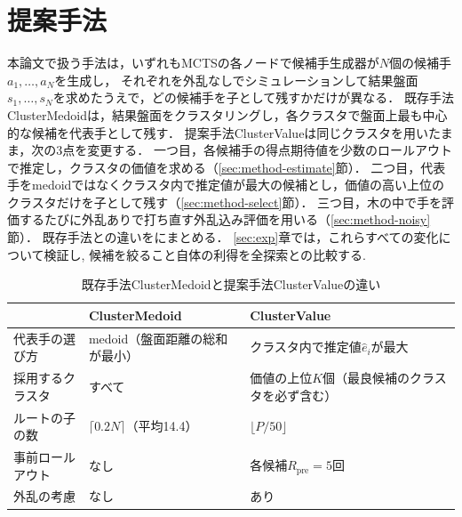 \documentclass[submit]{ipsj}
\begin{document}
\section{提案手法}
\label{sec:method}

本論文で扱う手法は，いずれもMCTSの各ノードで候補手生成器が$N$個の候補手$a_1,\dots,a_N$を生成し，
それぞれを外乱なしでシミュレーションして結果盤面$s_1,\dots,s_N$を求めたうえで，どの候補手を子として残すかだけが異なる．
既存手法ClusterMedoidは，結果盤面をクラスタリングし，各クラスタで盤面上最も中心的な候補を代表手として残す．
提案手法ClusterValueは同じクラスタを用いたまま，次の3点を変更する．
一つ目，各候補手の得点期待値を少数のロールアウトで推定し，クラスタの価値を求める（\ref{sec:method-estimate}節）．
二つ目，代表手をmedoidではなくクラスタ内で推定値が最大の候補とし，価値の高い上位のクラスタだけを子として残す（\ref{sec:method-select}節）．
三つ目，木の中で手を評価するたびに外乱ありで打ち直す外乱込み評価を用いる（\ref{sec:method-noisy}節）．
既存手法との違いをにまとめる．
\ref{sec:exp}章では，これらすべての変化について検証し, 候補を絞ること自体の利得を全探索との比較する.

\begin{table}[tb]
\caption{既存手法ClusterMedoidと提案手法ClusterValueの違い}
\label{tab:diff}
\centering
\begin{tabular}{p{}p{}p{}}\hline\hline
 & ClusterMedoid & ClusterValue \\\hline
代表手の選び方 & medoid（盤面距離の総和が最小） & クラスタ内で推定値$\hat{e}_i$が最大 \\
採用するクラスタ & すべて & 価値の上位$K$個（最良候補のクラスタを必ず含む） \\
ルートの子の数 & $\lceil 0.2N \rceil$（平均14.4） & $\lfloor P/50 \rfloor$ \\
事前ロールアウト & なし & 各候補$R_{\mathrm{pre}}=5$回 \\
外乱の考慮 & なし & あり \\\hline
\end{tabular}
\end{table}
\end{document}
